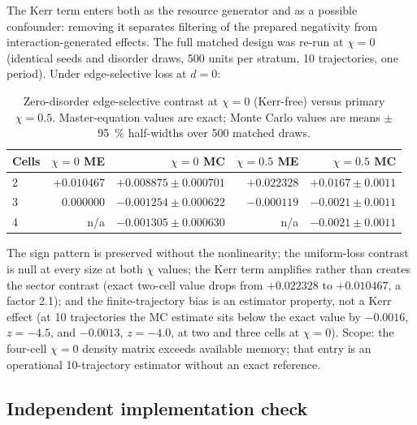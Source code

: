 \documentclass[aps,pra,preprint,superscriptaddress,amsmath,amssymb]{revtex4-2}
\begin{document}
The Kerr term enters both as the resource generator and as a possible confounder: removing it separates filtering of the prepared negativity from interaction-generated effects. The full matched design was re-run at $\chi=\num{0}$ (identical seeds and disorder draws, \num{500} units per stratum, \num{10} trajectories, one period). Under edge-selective loss at $d=\num{0}$:

\begin{table}[h]
\caption{Zero-disorder edge-selective contrast at $\chi=\num{0}$ (Kerr-free) versus primary $\chi=\num{0.5}$. Master-equation values are exact; Monte Carlo values are means $\pm$ \qty{95}{\percent} half-widths over \num{500} matched draws.}
\label{tab:kerrfree}
\begin{ruledtabular}
\begin{tabular}{lrrrr}
Cells & $\chi=0$ ME & $\chi=0$ MC & $\chi=\num{0.5}$ ME & $\chi=\num{0.5}$ MC \\
\hline
\num{2} & $+\num{0.010467}$ & $+\num{0.008875}\pm\num{0.000701}$ & $+\num{0.022328}$ & $+\num{0.0167}\pm\num{0.0011}$ \\
\num{3} & $\num{0.000000}$ & $-\num{0.001254}\pm\num{0.000622}$ & $-\num{0.000119}$ & $-\num{0.0021}\pm\num{0.0011}$ \\
\num{4} & n/a & $-\num{0.001305}\pm\num{0.000630}$ & n/a & $-\num{0.0021}\pm\num{0.0011}$ \\
\end{tabular}
\end{ruledtabular}
\end{table}

The sign pattern is preserved without the nonlinearity; the uniform-loss contrast is null at every size at both $\chi$ values; the Kerr term amplifies rather than creates the sector contrast (exact two-cell value drops from $+\num{0.022328}$ to $+\num{0.010467}$, a factor \num{2.1}); and the finite-trajectory bias is an estimator property, not a Kerr effect (at \num{10} trajectories the MC estimate sits below the exact value by $-\num{0.0016}$, $z=-4.5$, and $-\num{0.0013}$, $z=-4.0$, at two and three cells at $\chi=\num{0}$). Scope: the four-cell $\chi=\num{0}$ density matrix exceeds available memory; that entry is an operational \num{10}-trajectory estimator without an exact reference.

\subsection{Independent implementation check}
\end{document}
